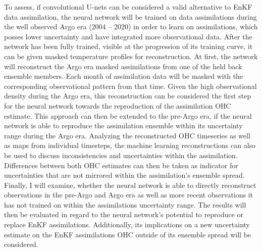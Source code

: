 \documentclass[Masterarbeit.tex]{subfile}
\begin{document}
	To assess, if convolutional U-nets can be considered a valid alternative to EnKF data assimilation, the neural network will be trained on data assimilations during the well observed Argo era (2004 -- 2020) in order to learn on assimilations, which posses lower uncertainty and have integrated more observational data. After the network has been fully trained, visible at the progression of its training curve, it can be given masked temperature profiles for reconstruction. At first, the network will reconstruct the Argo era masked assimilations from one of the held back ensemble members. Each month of assimilation data will be masked with the corresponding observational pattern from that time. Given the high observational density during the Argo era, this reconstruction can be considered the first step for the neural network towards the reproduction of the assimilation OHC estimate. This approach can then be extended to the pre-Argo era, if the neural network is able to reproduce the assimilation ensemble within its uncertainty range during the Argo era. Analyzing the reconstructed OHC timeseries as well as maps from individual timesteps, the machine learning reconstructions can also be used to discuss inconsistencies and uncertainties within the assimilation. Differences between both OHC estimates can then be taken as indicator for uncertainties that are not mirrored within the assimilation's ensemble spread. Finally, I will examine, whether the neural network is able to directly reconstruct observations in the pre-Argo and Argo era as well as more recent observations it has not trained on within the assimilations uncertainty range. The results will then be evaluated in regard to the neural network's potential to reproduce or replace EnKF assimilations. Additionally, its implications on a new uncertainty estimate on the EnKF assimilations OHC outside of its ensemble spread will be considered. \\
	
	
	
\end{document}
